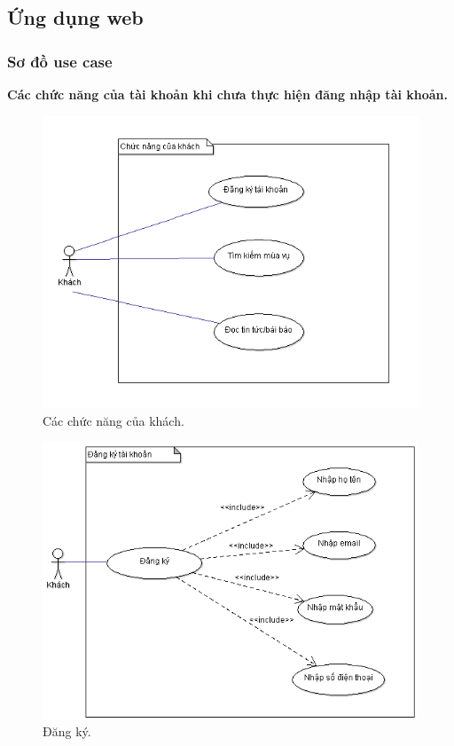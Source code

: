 \documentclass[a4paper,12pt,oneside]{article}
\begin{document}
\subsection{Ứng dụng web}
\subsubsection{Sơ đồ use case}
\indent \textbf{Các chức năng của tài khoản khi chưa thực hiện đăng nhập tài khoản.}\\

\begin{figure}[htp]
\centering
\includegraphics[scale=.9]{hinh/uc_web1.png}
\caption{Các chức năng của khách.}
\end{figure}

\newpage
\begin{figure}[htp]
\centering
\includegraphics[scale=.9]{hinh/reg.png}
\caption{Đăng ký.}
\end{figure}
\end{document}
